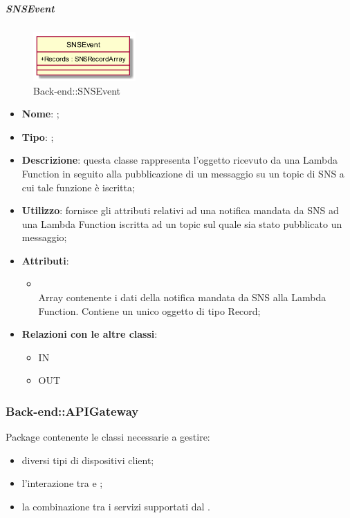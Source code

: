 \hypertarget{SNSEvent_label}{\subparagraph{SNSEvent}}
\begin{figure}[h]
	\centering
	\includegraphics[width=0.35\textwidth,height=\textheight,keepaspectratio]{images/ClassSNSEvent.png}
	\caption{Back-end::SNSEvent}
\end{figure}
\begin{itemize}
	\item \textbf{Nome}: ;
	\item \textbf{Tipo}: ;
	\item \textbf{Descrizione}: questa classe rappresenta l'oggetto ricevuto da una Lambda Function in seguito alla pubblicazione di un messaggio su un topic di SNS a cui tale funzione è iscritta;
	\item \textbf{Utilizzo}: fornisce gli attributi relativi ad una notifica mandata da SNS ad una Lambda Function iscritta ad un topic sul quale sia stato pubblicato un messaggio;
	\item \textbf{Attributi}:
	\begin{itemize}
		\item[]  \\
		Array contenente i dati della notifica mandata da SNS alla Lambda Function. Contiene un unico oggetto di tipo Record;
	\end{itemize}
	\item \textbf{Relazioni con le altre classi}:
	\begin{itemize}
		\item IN \hyperlink{VAMessageListener_label}{}
		\item OUT \hyperlink{SNSRecord_label}{}
	\end{itemize}
\end{itemize}
\FloatBarrier

\subsubsection{Back-end::APIGateway}
Package contenente le classi necessarie a gestire:
\begin{itemize}
	\item diversi tipi di  dispositivi client;
	\item l'interazione tra  e ;
	\item la combinazione tra i servizi supportati dal .
\end{itemize}
